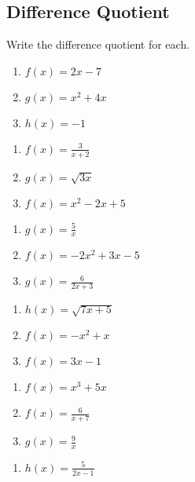 \subsection*{Difference Quotient}

Write the difference quotient for each.
\begin{multicols}{3}
\begin{enumerate}
	\item $f(x) = 2x - 7$
	\item $g(x) = x^2 + 4x$
	\item $h(x) = -1$
\end{enumerate}	\setcounter{Review}{\value{enumi}}
\end{multicols}
\begin{multicols}{3}
\begin{enumerate}	\setcounter{enumi}{\value{Review}} 
	\item $f(x) = \frac{3}{x+2}$
	\item $g(x) = \sqrt{3x}$
	\item $f(x) = x^2 - 2x + 5$
\end{enumerate}	\setcounter{Review}{\value{enumi}}
\end{multicols}
\begin{multicols}{3}
\begin{enumerate}	\setcounter{enumi}{\value{Review}} 
	\item $g(x) = \frac{5}{x}$
	\item $f(x) = -2x^2 + 3x - 5$
	\item $g(x) = \frac{6}{2x+3}$
\end{enumerate}	\setcounter{Review}{\value{enumi}}
\end{multicols}
\begin{multicols}{3}
\begin{enumerate}	\setcounter{enumi}{\value{Review}} 
	\item $h(x) = \sqrt{7x+5}$
	\item $f(x) = -x^2 + x$
	\item $f(x) = 3x - 1$
\end{enumerate}	\setcounter{Review}{\value{enumi}}
\end{multicols}
\begin{multicols}{3}
\begin{enumerate}	\setcounter{enumi}{\value{Review}} 
	\item $f(x) = x^3 + 5x$
	\item $f(x) = \frac{6}{x+7}$
	\item $g(x) = \frac{9}{x}$
\end{enumerate}	\setcounter{Review}{\value{enumi}}
\end{multicols}
\begin{multicols}{3}
\begin{enumerate}	\setcounter{enumi}{\value{Review}} 
	\item $h(x) = \frac{5}{2x-1}$
\end{enumerate}	\setcounter{Review}{\value{enumi}}
\end{multicols}

